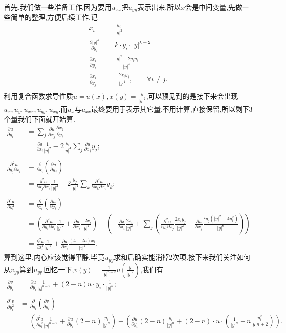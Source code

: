 \documentclass[12pt, a4paper]{ctexart}
\begin{document}
    首先,我们做一些准备工作,因为要用$u_{xx}$把$u_{yy}$表示出来,所以$x$会是中间变量,先做一些简单的整理,方便后续工作.记
    \begin{align*}
    x_i &= \frac{y_i}{|y|^2}\\
    \frac{\partial |y|^k}{\partial y_i} &= k \cdot y_i \cdot |y|^{k-2}\\
    \frac{\partial x_i}{\partial y_i} &= \frac{|y|^2-2y_iy_i}{|y|^4}\\
    \frac{\partial x_i}{\partial y_j} &= \frac{-2y_iy_j}{|y|^4},\qquad \forall i\neq j.\\
    \end{align*}
    利用复合函数求导性质$u=u(x), x(y) = \frac{y}{|y|^2}$,可以预见到的是接下来会出现$u_x,u_y,u_{xx},u_{yy},u_{xy}$.而$u_x$与$u_{xx}$最终要用于表示其它量,不用计算,直接保留,所以剩下3个量我们下面就开始算.
    \begin{align*}
    \frac{\partial u}{\partial y_i} &= \sum_j \frac{\partial u}{\partial x_j}\frac{\partial x_j}{\partial y_i} \\
    &= \frac{\partial u}{\partial x_i}\frac1{|y|^2} - 2\frac{y_i}{|y|^4}\sum_j\frac{\partial u}{\partial x_j}y_j;\\
    & \\
    \frac{\partial^2 u}{\partial y_j \partial x_i} &= \frac{\partial}{\partial x_i} (\frac{\partial u}{\partial y_j}) \\
    &= \frac{\partial^2 u}{\partial x_j \partial x_i}\frac1{|y|^2} - 2\frac{y_j}{|y|^4}\sum_k\frac{\partial^2 u}{\partial x_k \partial x_i} y_k;\\
    & \\
    \frac{\partial^2 u}{\partial y_i^2} &= \frac{\partial}{\partial y_i} (\frac{\partial u}{\partial y_i}) \\
    &= (\frac{\partial^2 u}{\partial y_i \partial x_i} \frac1{|y|^2} + \frac{\partial u}{\partial x_i}\frac{-2x_i}{|y|^2}) + (- \frac{\partial u}{\partial x_i}\frac{2x_i}{|y|^2} + \sum_j (\frac{\partial^2 u}{\partial y_i \partial x_j}\frac{2x_iy_j}{|y|^2} - \frac{\partial u}{\partial x_j}\frac{2y_j(|y|^2-4y_i^2)}{|y|^6})) \\
    &= \frac{\partial^2u}{\partial x_i^2}\frac1{|y|^4} + \frac{\partial u}{\partial x_i}\frac{(4-2n)x_i}{|y|^2}.
    \end{align*}
    算到这里,内心应该觉得平静.毕竟$u_{yy}$求和后确实能消掉2次项.接下来我们关注如何从$v_{yy}$算到$u_{yy}$.回忆一下,$v(y) = \frac1{|y|^{n-2}}u(\frac y{|y|^2})$,我们有
    \begin{align*}
    \frac{\partial v}{\partial y_i} &= \frac{\partial u}{\partial y_i}\frac1{|y|^{n-2}}+(2-n)u\cdot y_i \cdot \frac1{|y|^n};\\
    & \\
    \frac{\partial^2v}{\partial y_i^2} &= \frac{\partial}{\partial y_i}(\frac{\partial v}{\partial y_i}) \\
    &= (\frac{\partial^2u}{\partial y_i^2}\frac1{|y|^{n-2}} + \frac{\partial u}{\partial y_i}(2-n)\frac{y_i}{|y|^n}) + (\frac{\partial u}{\partial y_i}(2-n)\frac{y_i}{|y|^n} + (2-n)\cdot u \cdot (\frac1{|y|^n} - n\frac{y_i^2}{|y|{n+2}})).\\
    \end{align*}
\end{document}
